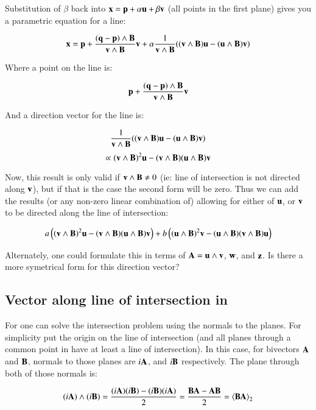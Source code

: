 \documentclass{article}      %
\newcommand{\gpgrade}[2] {{\left\langle{{#1}}\right\rangle}_{#2}}
\newcommand{\gpgradetwo}[1] {\gpgrade{#1}{2}}
\begin{document}
Substitution of $\beta$ back into $\mathbf{x} = \mathbf{p} + \alpha \mathbf{u} + \beta \mathbf{v}$ (all points in the first plane) gives you a parametric equation for a line:

\[
\mathbf{x} = \mathbf{p} + \frac{(\mathbf{q}-\mathbf{p})\wedge \mathbf{B}}{\mathbf{v} \wedge \mathbf{B}}\mathbf{v} + \alpha\frac{1}{\mathbf{v} \wedge \mathbf{B}}((\mathbf{v} \wedge \mathbf{B}) \mathbf{u} - (\mathbf{u} \wedge \mathbf{B})\mathbf{v})
\]

Where a point on the line is:

\[
\mathbf{p} + \frac{(\mathbf{q}-\mathbf{p})\wedge \mathbf{B}}{\mathbf{v} \wedge \mathbf{B}}\mathbf{v} 
\]

And a direction vector for the line is:

\[
\frac{1}{\mathbf{v} \wedge \mathbf{B}}((\mathbf{v} \wedge \mathbf{B}) \mathbf{u} - (\mathbf{u} \wedge \mathbf{B})\mathbf{v})
\]
\[
\propto
(\mathbf{v} \wedge \mathbf{B})^2 \mathbf{u} - (\mathbf{v} \wedge \mathbf{B})(\mathbf{u} \wedge \mathbf{B})\mathbf{v}
\]

Now, this result is only valid if $\mathbf{v} \wedge \mathbf{B} \ne 0$ (ie: line of intersection is not directed along $\mathbf{v}$), but if that is the case the second form will be zero.  Thus we can add the results (or any non-zero linear combination of) allowing for either of $\mathbf{u}$, or $\mathbf{v}$ to be directed along the line of intersection:

\begin{equation}\label{eqn:dirvecintersection}
a\left( (\mathbf{v} \wedge \mathbf{B})^2 \mathbf{u}
- (\mathbf{v} \wedge \mathbf{B})(\mathbf{u} \wedge \mathbf{B})\mathbf{v} \right)
+ b\left((\mathbf{u} \wedge \mathbf{B})^2 \mathbf{v} 
- (\mathbf{u} \wedge \mathbf{B})(\mathbf{v} \wedge \mathbf{B})\mathbf{u}\right)
\end{equation}

Alternately, one could formulate this in terms of $\mathbf{A} = \mathbf{u} \wedge \mathbf{v}$, $\mathbf{w}$, and $\mathbf{z}$.  Is there a more symetrical form for this direction vector?

\subsection{ Vector along line of intersection in }

For  one can solve the intersection problem using the normals to the planes.  For simplicity put the origin on the line of intersection (and all planes through a common point in  have at least a line of intersection).  In this case, for bivectors $\mathbf{A}$ and $\mathbf{B}$, normals to those planes are $i\mathbf{A}$, and $i\mathbf{B}$ respectively.  The plane through both of those normals is:

\begin{align*}
(i\BA) \wedge (i\BB)
= \frac{(i\BA)(i\BB) - (i\BB)(i\BA)}{2} 
= \frac{\BB\BA - \BA\BB}{2} 
= \gpgradetwo{\BB\BA}
\end{align*}
\end{document}
